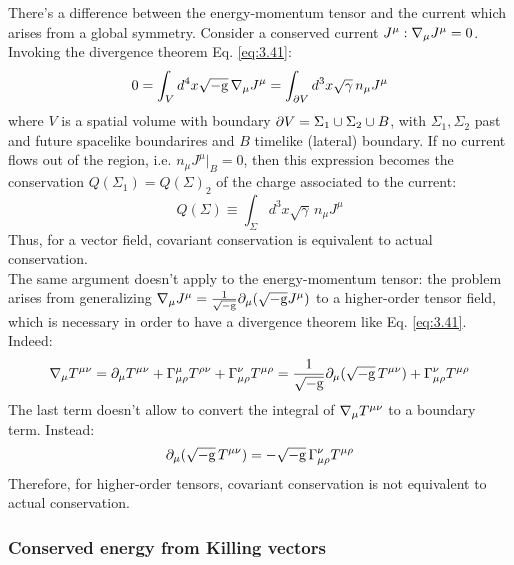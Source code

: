 There's a difference between the energy-momentum tensor and the current which arises from a global symmetry. Consider a conserved current $ J^\mu : \nabla_\mu J^\mu = 0 $. Invoking the divergence theorem Eq. \ref{eq:3.41}:
\begin{equation*}
  0 = \int_V d^4 x \sqrt{-\mathrm{g}}\, \nabla_\mu J^\mu = \int_{\partial V} d^3 x \sqrt{\gamma}\, n_{\mu} J^\mu
\end{equation*}
where $ V $ is a spatial volume with boundary $ \partial V = \Sigma_1 \cup \Sigma_2 \cup B $, with $ \Sigma_1, \Sigma_2 $ past and future spacelike boundarires and $ B $ timelike (lateral) boundary. If no current flows out of the region, i.e. $ n_\mu J^\mu \vert_B = 0 $, then this expression becomes the conservation $ Q(\Sigma_1) = Q(\Sigma)_2 $ of the charge associated to the current:
\begin{equation*}
  Q(\Sigma) \equiv \int_\Sigma d^3 x \sqrt{\gamma}\, n_\mu J^\mu
\end{equation*}
Thus, for a vector field, covariant conservation is equivalent to actual conservation.\\
The same argument doesn't apply to the energy-momentum tensor: the problem arises from generalizing $ \nabla_\mu J^\mu = \frac{1}{\sqrt{-\mathrm{g}}} \partial_\mu (\sqrt{-\mathrm{g}} J^\mu) $ to a higher-order tensor field, which is necessary in order to have a divergence theorem like Eq. \ref{eq:3.41}. Indeed:
\begin{equation*}
  \nabla_\mu T^{\mu \nu} = \partial_\mu T^{\mu \nu} + \Gamma^\mu_{\mu \rho} T^{\rho \nu} + \Gamma^\nu_{\mu \rho} T^{\mu \rho} = \frac{1}{\sqrt{-\mathrm{g}}} \partial_\mu (\sqrt{-\mathrm{g}}\, T^{\mu \nu}) + \Gamma^\nu_{\mu \rho} T^{\mu \rho}
\end{equation*}
The last term doesn't allow to convert the integral of $ \nabla_\mu T^{\mu \nu} $ to a boundary term. Instead:
\begin{equation}
  \partial_\mu (\sqrt{-\mathrm{g}}\, T^{\mu \nu}) = -\sqrt{-\mathrm{g}}\, \Gamma^\nu_{\mu \rho} T^{\mu \rho}
  \label{eq:4.49}
\end{equation}
Therefore, for higher-order tensors, covariant conservation is not equivalent to actual conservation.

\subsubsection{Conserved energy from Killing vectors}

